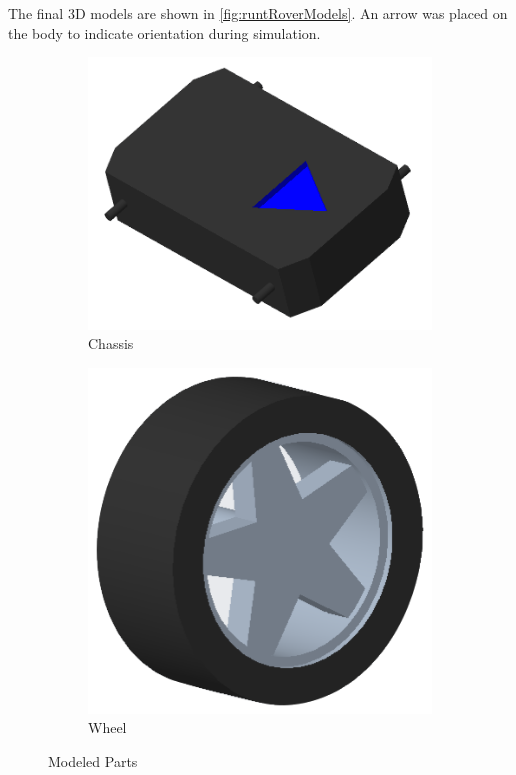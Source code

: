The final 3D models are shown in \autoref{fig:runtRoverModels}. An arrow was placed on the body to indicate orientation during simulation.

\begin{figure}
    \centering
    \begin{subfigure}[b]{0.6\textwidth}
        \centering
        \includegraphics[width=\textwidth]{figs/img/runtRoverChassis}
        \caption{Chassis}
        \label{fig:runtRoverChassis}
    \end{subfigure}
    \hfill
    \begin{subfigure}[b]{0.3\textwidth}
        \centering
        \includegraphics[width=\textwidth]{figs/img/runtRoverWheel}
        \caption{Wheel}
        \label{fig:runtRoverWheel}
    \end{subfigure}
    \caption{Modeled Parts}
    \label{fig:runtRoverModels}
\end{figure}

